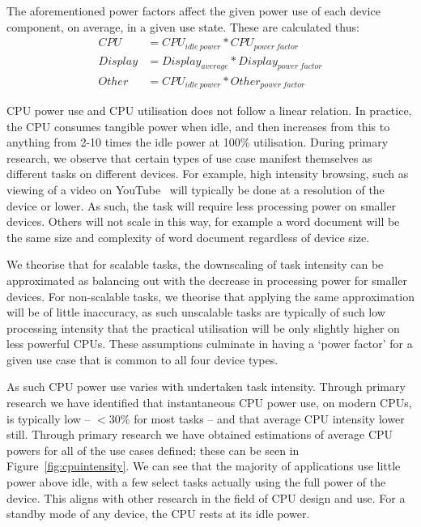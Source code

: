 \documentclass[conference]{IEEEtran}
\begin{document}
The aforementioned power factors affect the given power use of each
device component, on average, in a given use state. These are
calculated thus:
\begin{align*}
CPU &= CPU_{idle\ power} * CPU_{power\ factor}\\
Display &= Display_{average} * Display_{power\ factor}\\
Other &= CPU_{idle\ power} * Other_{power\ factor}
\end{align*}

CPU power use and CPU utilisation does not follow a linear
relation. In practice, the CPU consumes tangible power when idle, and
then increases from this to anything from 2-10 times the idle power at
100\% utilisation. During primary research, we observe that certain
types of use case manifest themselves as different tasks on different
devices. For example, high intensity browsing, such as viewing of a
video on YouTube~\cite{schien-et-al:2013} will typically be done at a
resolution of the device or lower. As such, the task will require less
processing power on smaller devices. Others will not scale in this
way, for example a word document will be the same size and complexity
of word document regardless of device size.

We theorise that for scalable tasks, the downscaling of task
intensity can be approximated as balancing out with the decrease in
processing power for smaller devices. For non-scalable tasks, we
theorise that applying the same approximation will be of
little inaccuracy, as such unscalable tasks are typically of such low
processing intensity that the practical utilisation will be only
slightly higher on less powerful CPUs.  These assumptions culminate in
having a `power factor' for a given use case that is common to all
four device types.

As such CPU power use varies with undertaken task intensity.
Through primary research we have identified that
instantaneous CPU power use, on modern CPUs, is typically low --
$<$30\% for most tasks -- and that average CPU intensity lower
still. Through primary research we have obtained estimations of
average CPU powers for all of the use cases defined; these can be seen
in Figure~\ref{fig:cpuintensity}. We can see that the majority of
applications use little power above idle, with a few select tasks
actually using the full power of the device. This aligns with other
research in the field of CPU design and use. For a standby mode of any
device, the CPU rests at its idle power.
\end{document}
